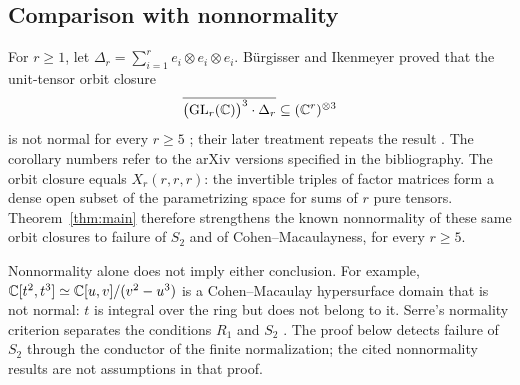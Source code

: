 \subsection{Comparison with nonnormality}\label{sec:nonnormality}

For $r\geq1$, let
$\Delta_r=\sum_{i=1}^r e_i\otimes e_i\otimes e_i$.
B\"urgisser and Ikenmeyer proved that the unit-tensor orbit closure
\[
 \overline{\bigl(\operatorname{GL}_r(\mathbb C)\bigr)^3\cdot\Delta_r}
 \subseteq (\mathbb C^r)^{\otimes3}
\]
is not normal for every $r\geq5$
\cite[Corollary~7.2(2)]{BurgisserIkenmeyer2011}; their later treatment
repeats the result \cite[Corollary~5.26]{BurgisserIkenmeyer2017}.
The corollary numbers refer to the arXiv versions specified in the
bibliography. The orbit closure equals $X_r(r,r,r)$: the invertible
triples of factor matrices form a dense open subset of the
parametrizing space for sums of $r$ pure tensors.
Theorem~\ref{thm:main} therefore strengthens the known nonnormality
of these same orbit closures to failure of $S_2$ and of
Cohen--Macaulayness, for every $r\geq5$.

Nonnormality alone does not imply either conclusion. For example,
$\mathbb C[t^2,t^3]\simeq\mathbb C[u,v]/(v^2-u^3)$ is a Cohen--Macaulay
hypersurface domain that is not normal: $t$ is integral over the
ring but does not belong to it. Serre's normality criterion separates
the conditions $R_1$ and $S_2$ \cite[Tag~031S]{stacks-project}.
The proof below detects failure of $S_2$ through the conductor of
the finite normalization; the cited nonnormality results are not
assumptions in that proof.
